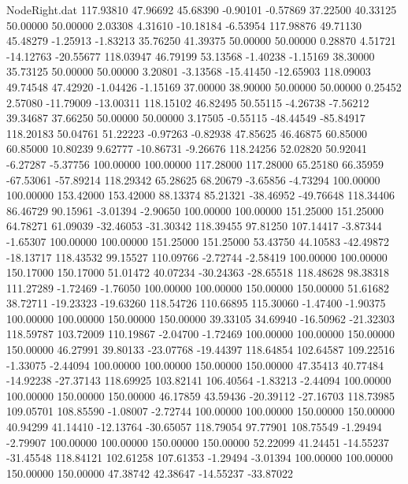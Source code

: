 \begin{filecontents}{NodeRight.dat}
 117.93810   47.96692   45.68390    -0.90101   -0.57869   37.22500   40.33125   50.00000   50.00000    2.03308    4.31610  -10.18184   -6.53954
 117.98876   49.71130   45.48279    -1.25913   -1.83213   35.76250   41.39375   50.00000   50.00000    0.28870    4.51721  -14.12763  -20.55677
 118.03947   46.79199   53.13568    -1.40238   -1.15169   38.30000   35.73125   50.00000   50.00000    3.20801   -3.13568  -15.41450  -12.65903
 118.09003   49.74548   47.42920    -1.04426   -1.15169   37.00000   38.90000   50.00000   50.00000    0.25452    2.57080  -11.79009  -13.00311
 118.15102   46.82495   50.55115    -4.26738   -7.56212   39.34687   37.66250   50.00000   50.00000    3.17505   -0.55115  -48.44549  -85.84917
 118.20183   50.04761   51.22223    -0.97263   -0.82938   47.85625   46.46875   60.85000   60.85000   10.80239    9.62777  -10.86731   -9.26676
 118.24256   52.02820   50.92041    -6.27287   -5.37756  100.00000  100.00000  117.28000  117.28000   65.25180   66.35959  -67.53061  -57.89214
 118.29342   65.28625   68.20679    -3.65856   -4.73294  100.00000  100.00000  153.42000  153.42000   88.13374   85.21321  -38.46952  -49.76648
 118.34406   86.46729   90.15961    -3.01394   -2.90650  100.00000  100.00000  151.25000  151.25000   64.78271   61.09039  -32.46053  -31.30342
 118.39455   97.81250  107.14417    -3.87344   -1.65307  100.00000  100.00000  151.25000  151.25000   53.43750   44.10583  -42.49872  -18.13717
 118.43532   99.15527  110.09766    -2.72744   -2.58419  100.00000  100.00000  150.17000  150.17000   51.01472   40.07234  -30.24363  -28.65518
 118.48628   98.38318  111.27289    -1.72469   -1.76050  100.00000  100.00000  150.00000  150.00000   51.61682   38.72711  -19.23323  -19.63260
 118.54726  110.66895  115.30060    -1.47400   -1.90375  100.00000  100.00000  150.00000  150.00000   39.33105   34.69940  -16.50962  -21.32303
 118.59787  103.72009  110.19867    -2.04700   -1.72469  100.00000  100.00000  150.00000  150.00000   46.27991   39.80133  -23.07768  -19.44397
 118.64854  102.64587  109.22516    -1.33075   -2.44094  100.00000  100.00000  150.00000  150.00000   47.35413   40.77484  -14.92238  -27.37143
 118.69925  103.82141  106.40564    -1.83213   -2.44094  100.00000  100.00000  150.00000  150.00000   46.17859   43.59436  -20.39112  -27.16703
 118.73985  109.05701  108.85590    -1.08007   -2.72744  100.00000  100.00000  150.00000  150.00000   40.94299   41.14410  -12.13764  -30.65057
 118.79054   97.77901  108.75549    -1.29494   -2.79907  100.00000  100.00000  150.00000  150.00000   52.22099   41.24451  -14.55237  -31.45548
 118.84121  102.61258  107.61353    -1.29494   -3.01394  100.00000  100.00000  150.00000  150.00000   47.38742   42.38647  -14.55237  -33.87022

\end{filecontents}
